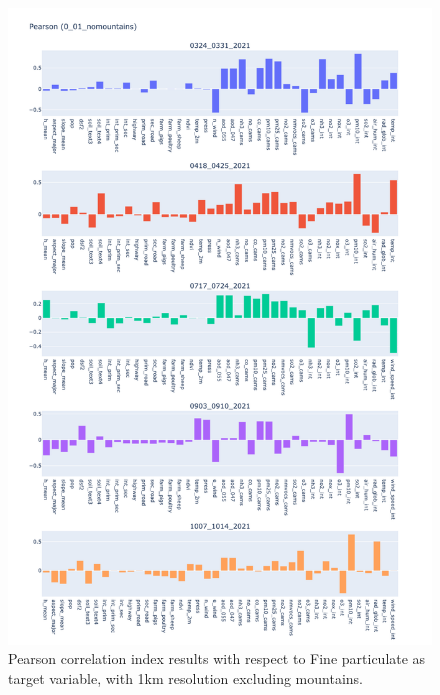 \begin{figure}[H]
    \centering
    \includegraphics[scale=0.35]{images/tests/0_01_nomountainspm25_st_pearson.png}
    \caption{Pearson correlation index results with respect to Fine particulate as target variable, with 1km resolution excluding mountains.}
    \label{fig:overview}
\end{figure}


